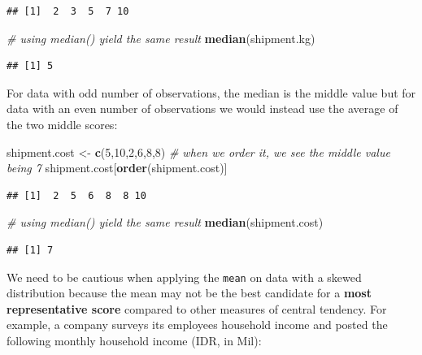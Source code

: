 \documentclass[]{article}
\newenvironment{Shaded}{\begin{snugshade}}{\end{snugshade}}
\newcommand{\CommentTok}[1]{\textcolor[rgb]{0.56,0.35,0.01}{\textit{#1}}}
\newcommand{\DecValTok}[1]{\textcolor[rgb]{0.00,0.00,0.81}{#1}}
\newcommand{\KeywordTok}[1]{\textcolor[rgb]{0.13,0.29,0.53}{\textbf{#1}}}
\newcommand{\NormalTok}[1]{#1}
\newcommand{\StringTok}[1]{\textcolor[rgb]{0.31,0.60,0.02}{#1}}
\begin{document}
\begin{verbatim}
## [1]  2  3  5  7 10
\end{verbatim}

\begin{Shaded}
\begin{Highlighting}[]
\CommentTok{# using median() yield the same result}
\KeywordTok{median}\NormalTok{(shipment.kg)}
\end{Highlighting}
\end{Shaded}

\begin{verbatim}
## [1] 5
\end{verbatim}

For data with odd number of observations, the median is the middle value
but for data with an even number of observations we would instead use
the average of the two middle scores:

\begin{Shaded}
\begin{Highlighting}[]
\NormalTok{shipment.cost <-}\StringTok{ }\KeywordTok{c}\NormalTok{(}\DecValTok{5}\NormalTok{,}\DecValTok{10}\NormalTok{,}\DecValTok{2}\NormalTok{,}\DecValTok{6}\NormalTok{,}\DecValTok{8}\NormalTok{,}\DecValTok{8}\NormalTok{)}
\CommentTok{# when we order it, we see the middle value being 7}
\NormalTok{shipment.cost[}\KeywordTok{order}\NormalTok{(shipment.cost)]}
\end{Highlighting}
\end{Shaded}

\begin{verbatim}
## [1]  2  5  6  8  8 10
\end{verbatim}

\begin{Shaded}
\begin{Highlighting}[]
\CommentTok{# using median() yield the same result}
\KeywordTok{median}\NormalTok{(shipment.cost)}
\end{Highlighting}
\end{Shaded}

\begin{verbatim}
## [1] 7
\end{verbatim}

We need to be cautious when applying the \texttt{mean} on data with a
skewed distribution because the mean may not be the best candidate for a
\textbf{most representative score} compared to other measures of central
tendency. For example, a company surveys its employees household income
and posted the following monthly household income (IDR, in Mil):
\end{document}
